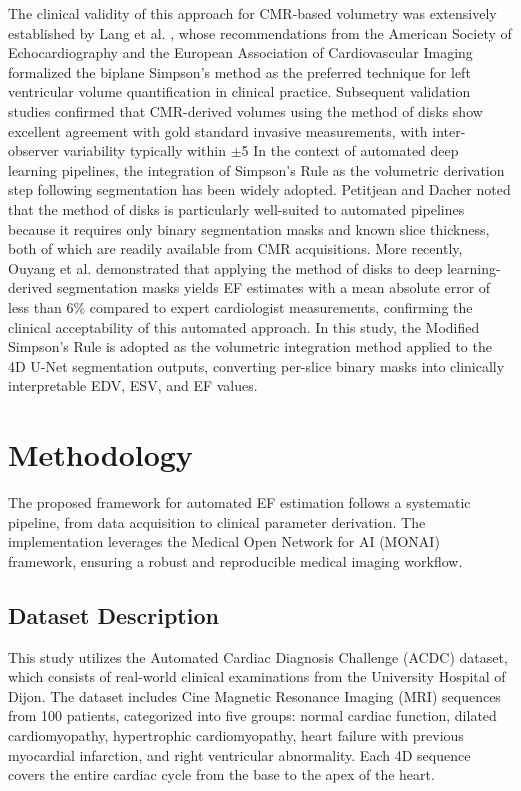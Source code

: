 \documentclass[final,3p,times,twocolumn]{elsarticle}
\begin{document}
The clinical validity of this approach for CMR-based volumetry was extensively established by Lang et al. \cite{b28}, whose recommendations from the American Society of Echocardiography and the European Association of Cardiovascular Imaging formalized the biplane Simpson's method as the preferred technique for left ventricular volume quantification in clinical practice. Subsequent validation studies confirmed that CMR-derived volumes using the method of disks show excellent agreement with gold standard invasive measurements, with inter-observer variability typically within $\pm$5%
In the context of automated deep learning pipelines, the integration of Simpson's Rule as the volumetric derivation step following segmentation has been widely adopted. Petitjean and Dacher \cite{b17} noted that the method of disks is particularly well-suited to automated pipelines because it requires only binary segmentation masks and known slice thickness, both of which are readily available from CMR acquisitions. More recently, Ouyang et al. \cite{b20} demonstrated that applying the method of disks to deep learning-derived segmentation masks yields EF estimates with a mean absolute error of less than 6\% compared to expert cardiologist measurements, confirming the clinical acceptability of this automated approach. In this study, the Modified Simpson's Rule is adopted as the volumetric integration method applied to the 4D U-Net segmentation outputs, converting per-slice binary masks into clinically interpretable EDV, ESV, and EF values.


\section{Methodology}
\label{sec:methodology}
The proposed framework for automated EF estimation follows a systematic pipeline, from data acquisition to clinical parameter derivation. The implementation leverages the Medical Open Network for AI (MONAI) framework, ensuring a robust and reproducible medical imaging workflow.

\subsection{Dataset Description}
This study utilizes the Automated Cardiac Diagnosis Challenge (ACDC) dataset, which consists of real-world clinical examinations from the University Hospital of Dijon. The dataset includes Cine Magnetic Resonance Imaging (MRI) sequences from 100 patients, categorized into five groups: normal cardiac function, dilated cardiomyopathy, hypertrophic cardiomyopathy, heart failure with previous myocardial infarction, and right ventricular abnormality. Each 4D sequence covers the entire cardiac cycle from the base to the apex of the heart.
\end{document}
